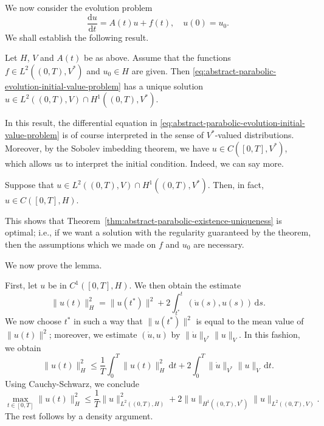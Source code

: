 We now consider the evolution problem
\begin{equation}\label{eq:abstract-parabolic-evolution-initial-value-problem}
\dfrac{\mathrm{d}u}{\mathrm{d}t}=A(t)u+f(t),\quad u(0)=u_0.
\end{equation}
We shall establish the following result.

\begin{Theorem}
\label{thm:abstract-parabolic-existence-uniqueness}
Let $H$, $V$ and $A(t)$ be as above. Assume that the functions $f\in L^2((0,T),V^*)$ and $u_0\in H$ are given. Then \eqref{eq:abstract-parabolic-evolution-initial-value-problem} has a unique solution $u\in L^2((0,T),V)\cap H^1((0,T),V^*)$.
\end{Theorem}

In this result, the differential equation in \eqref{eq:abstract-parabolic-evolution-initial-value-problem} is of course interpreted in the sense of $V^*$-valued distributions. Moreover, by the Sobolev imbedding theorem, we have $u\in C([0,T],V^*)$, which allows us to interpret the initial condition. Indeed, we can say more.

\begin{Lemma}
\label{lem:parabolic-energy-space-hilbert-continuity}
Suppose that $u\in L^2((0,T),V)\cap H^1((0,T),V^*)$. Then, in fact, $u\in C([0,T],H)$.
\end{Lemma}

This shows that Theorem~\ref{thm:abstract-parabolic-existence-uniqueness} is optimal; i.e., if we want a solution with the regularity guaranteed by the theorem, then the assumptions which we made on $f$ and $u_0$ are necessary.\par We now prove the lemma.

\begin{Proof}
First, let $u$ be in $C^1([0,T],H)$. We then obtain the estimate
\begin{equation}\label{eq:parabolic-energy-space-continuity-identity}
\|u(t)\|_H^2=\|u(t^*)\|^2+2\int_{t^*}^t(\dot u(s),u(s))\,\mathrm{d}s.
\end{equation}
We now choose $t^*$ in such a way that $\|u(t^*)\|^2$ is equal to the mean value of $\|u(t)\|^2$; moreover, we estimate $(\dot u,u)$ by $\|\dot u\|_{V^*}\|u\|_V$. In this fashion, we obtain
\begin{equation}\label{eq:parabolic-energy-space-continuity-integral-bound}
\|u(t)\|_H^2\leq\dfrac{1}{T}\int_0^T\|u(t)\|_H^2\,\mathrm{d}t+2\int_0^T\|\dot u\|_{V^*}\|u\|_V\,\mathrm{d}t.
\end{equation}
Using Cauchy-Schwarz, we conclude
\begin{equation}\label{eq:parabolic-energy-space-hilbert-continuous-bound}
\max_{t\in[0,T]}\|u(t)\|_H^2\leq\dfrac{1}{T}\|u\|_{L^2((0,T),H)}^2+2\|u\|_{H^1((0,T),V^*)}\|u\|_{L^2((0,T),V)}.
\end{equation}
The rest follows by a density argument.
\end{Proof}

